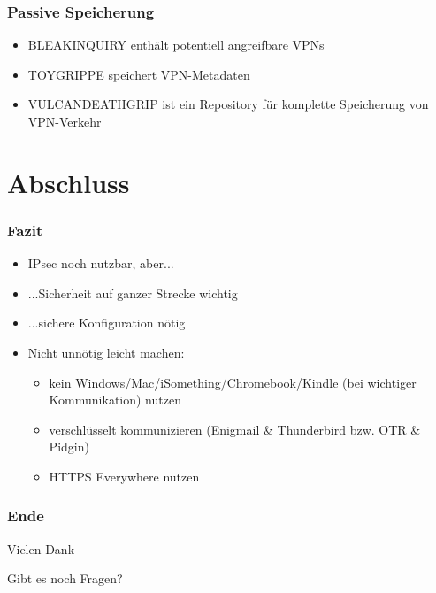 \documentclass[t]{beamer}
\begin{document}
\begin{frame}
	\frametitle{Passive Speicherung}
	\begin{itemize}
		\vfill
		\item BLEAKINQUIRY enthält potentiell angreifbare VPNs
		\vfill
		\item TOYGRIPPE speichert VPN-Metadaten
		\vfill
		\item VULCANDEATHGRIP ist ein Repository für komplette Speicherung von VPN-Verkehr
		\vfill
	\end{itemize}
\end{frame}

\section{Abschluss}
\begin{frame}
	\frametitle{Fazit}
	\begin{itemize}
		\vfill
		\item IPsec noch nutzbar, aber...
		\vfill
		\item ...Sicherheit auf ganzer Strecke wichtig
		\vfill
		\item ...sichere Konfiguration nötig
		\vfill
		\item Nicht unnötig leicht machen:
			\begin{itemize}
				\item kein Windows/Mac/iSomething/Chromebook/Kindle (bei wichtiger Kommunikation) nutzen
				\item verschlüsselt kommunizieren (Enigmail \& Thunderbird bzw. OTR \& Pidgin)
				\item HTTPS Everywhere nutzen
			\end{itemize}
	\end{itemize}
\end{frame}

\begin{frame}[c]
	\frametitle{Ende}
	\centering
	Vielen Dank
	
	Gibt es noch Fragen?
\end{frame}
\end{document}
